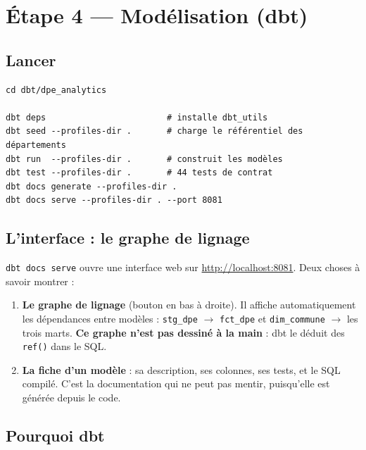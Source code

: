 \documentclass[11pt,a4paper]{article}
\newcommand{\cmd}[1]{\texttt{\small #1}}
\begin{document}
\newpage
\section{Étape 4 — Modélisation (dbt)}

\subsection{Lancer}

\begin{lstlisting}[style=sh]
cd dbt/dpe_analytics

dbt deps                        # installe dbt_utils
dbt seed --profiles-dir .       # charge le référentiel des départements
dbt run  --profiles-dir .       # construit les modèles
dbt test --profiles-dir .       # 44 tests de contrat
dbt docs generate --profiles-dir .
dbt docs serve --profiles-dir . --port 8081
\end{lstlisting}

\subsection{L'interface : le graphe de lignage}

\cmd{dbt docs serve} ouvre une interface web sur
\url{http://localhost:8081}. Deux choses à savoir montrer :

\begin{enumerate}
  \item \textbf{Le graphe de lignage} (bouton en bas à droite). Il affiche
        automatiquement les dépendances entre modèles :
        \cmd{stg\_dpe} $\rightarrow$ \cmd{fct\_dpe} et \cmd{dim\_commune}
        $\rightarrow$ les trois marts. \textbf{Ce graphe n'est pas dessiné à la
        main} : dbt le déduit des \cmd{ref()} dans le SQL.
  \item \textbf{La fiche d'un modèle} : sa description, ses colonnes, ses
        tests, et le SQL compilé. C'est la documentation qui ne peut pas
        mentir, puisqu'elle est générée depuis le code.
\end{enumerate}

\subsection{Pourquoi dbt}
\end{document}
